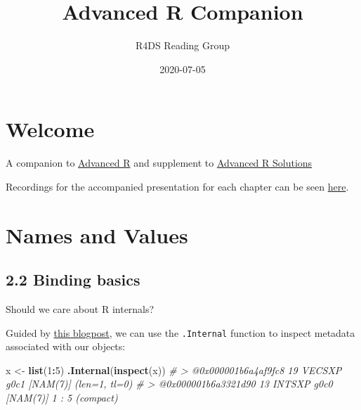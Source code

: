 \documentclass[]{book}
\title{Advanced R Companion}
\author{R4DS Reading Group}
\date{2020-07-05}
\newenvironment{Shaded}{\begin{snugshade}}{\end{snugshade}}
\newcommand{\CommentTok}[1]{\textcolor[rgb]{0.56,0.35,0.01}{\textit{#1}}}
\newcommand{\DecValTok}[1]{\textcolor[rgb]{0.00,0.00,0.81}{#1}}
\newcommand{\KeywordTok}[1]{\textcolor[rgb]{0.13,0.29,0.53}{\textbf{#1}}}
\newcommand{\NormalTok}[1]{#1}
\newcommand{\OperatorTok}[1]{\textcolor[rgb]{0.81,0.36,0.00}{\textbf{#1}}}
\newcommand{\StringTok}[1]{\textcolor[rgb]{0.31,0.60,0.02}{#1}}
\begin{document}
\maketitle

{
\setcounter{tocdepth}{1}
\tableofcontents
}
\hypertarget{welcome}{%
\chapter{Welcome}\label{welcome}}

A companion to \href{https://adv-r.hadley.nz/rcpp.html\#acknowledgments}{Advanced R} and supplement to \href{https://advanced-r-solutions.rbind.io/names-and-values.html\#copy-on-modify}{Advanced R Solutions}

Recordings for the accompanied presentation for each chapter can be seen \href{https://www.youtube.com/watch?v=pQ-xDAPEQaw\&list=PL3x6DOfs2NGi9lH7q-phZlPrl6HKXYDbn}{here}.

\hypertarget{names-and-values}{%
\chapter{Names and Values}\label{names-and-values}}

\hypertarget{binding-basics}{%
\section*{2.2 Binding basics}\label{binding-basics}}

Should we care about R internals?

Guided by \href{https://www.brodieg.com/2019/02/18/an-unofficial-reference-for-internal-inspect/}{this blogpost}, we can use the \texttt{.Internal} function to inspect metadata associated with our objects:

\begin{Shaded}
\begin{Highlighting}[]
\NormalTok{ x <-}\StringTok{ }\KeywordTok{list}\NormalTok{(}\DecValTok{1}\OperatorTok{:}\DecValTok{5}\NormalTok{)}
\KeywordTok{.Internal}\NormalTok{(}\KeywordTok{inspect}\NormalTok{(x))}
\CommentTok{# > @0x000001b6a4af9fc8 19 VECSXP g0c1 [NAM(7)] (len=1, tl=0)}
\CommentTok{# > @0x000001b6a3321d90 13 INTSXP g0c0 [NAM(7)]  1 : 5 (compact)}
\end{Highlighting}
\end{Shaded}
\end{document}
